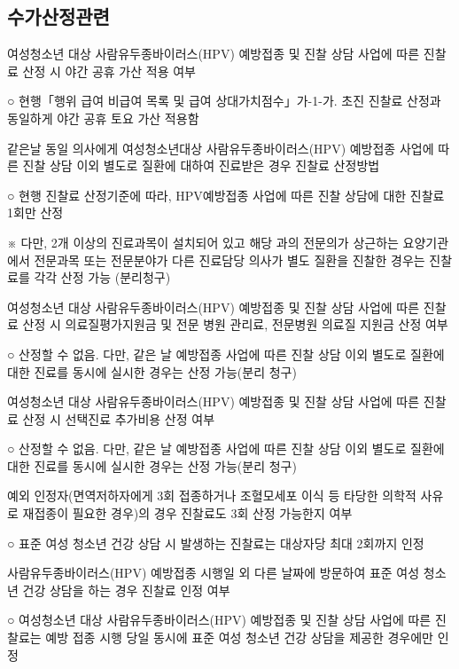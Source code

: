 \subsection{수가산정관련}
여성청소년 대상 사람유두종바이러스(HPV) 예방접종 및 진찰\cntrdot{}  상담 사업에 따른 진찰료 산정 시 야간\cntrdot{} 공휴 가산 적용 여부 \par
\begin{quotebox}
○ 현행「행위 급여\cntrdot{} 비급여 목록 및 급여 상대가치점수」가-1-가. 초진 진찰료 산정과 동일하게   야간\cntrdot{} 공휴\cntrdot{} 토요 가산 적용함
\end{quotebox}
같은날 동일 의사에게 여성청소년대상 사람유두종바이러스(HPV) 예방접종 사업에 따른 진찰\cntrdot{} 상담 이외 별도로 질환에 대하여 진료받은 경우 진찰료 산정방법
\begin{quotebox}
○ 현행 진찰료 산정기준에 따라, HPV예방접종 사업에 따른 진찰\cntrdot{} 상담에 대한 진찰료 1회만 산정  \par
※ 다만, 2개 이상의 진료과목이 설치되어 있고 해당 과의 전문의가 상근하는 요양기관에서 전문과목 또는 전문분야가 다른 진료담당 의사가 별도 질환을 진찰한 경우는 진찰료를 각각 산정 가능 (분리청구)
\end{quotebox}
여성청소년 대상 사람유두종바이러스(HPV) 예방접종 및 진찰\cntrdot{}  상담 사업에 따른 진찰료 산정 시 의료질평가지원금 및 전문  병원 관리료, 전문병원 의료질 지원금 산정 여부
\begin{quotebox}
○ 산정할 수 없음. 다만, 같은 날 예방접종 사업에 따른 진찰\cntrdot{} 상담 이외 별도로 질환에 대한 진료를 동시에 실시한 경우는 산정 가능(분리 청구)
\end{quotebox}
여성청소년 대상 사람유두종바이러스(HPV) 예방접종 및 진찰\cntrdot{}  상담 사업에 따른 진찰료 산정 시 선택진료 추가비용 산정 여부
\begin{quotebox}
○ 산정할 수 없음. 다만, 같은 날 예방접종 사업에 따른 진찰\cntrdot{} 상담 이외 별도로 질환에 대한 진료를 동시에 실시한 경우는 산정 가능(분리 청구)
\end{quotebox}
예외 인정자(면역저하자에게 3회 접종하거나 조혈모세포 이식 등 타당한 의학적 사유로 재접종이 필요한 경우)의 경우 진찰료도  3회 산정 가능한지 여부
\begin{quotebox}
○ 표준 여성 청소년 건강 상담 시 발생하는 진찰료는 대상자당 최대 2회까지 인정
\end{quotebox}
사람유두종바이러스(HPV) 예방접종 시행일 외 다른 날짜에   방문하여 표준 여성 청소년 건강 상담을 하는 경우 진찰료 인정 여부
\begin{quotebox}
○ 여성청소년 대상 사람유두종바이러스(HPV) 예방접종 및 진찰\cntrdot{} 상담 사업에 따른 진찰료는 예방 접종 시행 당일 동시에 표준 여성 청소년 건강 상담을 제공한 경우에만 인정
\end{quotebox}


